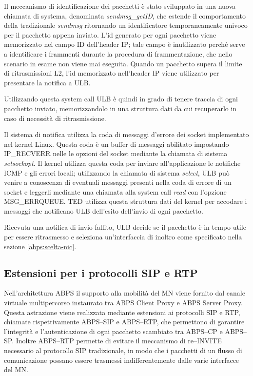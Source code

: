 \documentclass[12pt,a4paper,openright,twoside]{book}
\begin{document}
Il meccanismo di identificazione dei pacchetti è stato sviluppato in
una nuova chiamata di systema, denominata \emph{sendmsg\_getID}, che
estende il comportamento della tradizionale \emph{sendmsg} ritornando
un identificatore temporaneamente univoco per il pacchetto appena
inviato. L'id generato per ogni pacchetto viene memorizzato nel campo
ID dell'header IP; tale campo è inutilizzato perché serve a
identificare i frammenti durante la procedura di frammentazione, che
nello scenario in esame non viene mai eseguita. Quando un pacchetto
supera il limite di ritrasmissioni L2, l'id memorizzato nell'header IP
viene utilizzato per presentare la notifica a ULB.

Utilizzando questa system call ULB è quindi in grado di
tenere traccia di ogni pacchetto inviato, memorizzandolo in una
struttura dati da cui recuperarlo in caso di necessità di
ritrasmissione.

Il sistema di notifica utilizza la coda di messaggi d'errore dei
socket implementato nel kernel Linux. Questa coda è un buffer di
messaggi abilitato impostando IP\_RECVERR nelle le opzioni del socket
mediante la chiamata di sistema \emph{setsockopt}. Il kernel utilizza
questa coda per inviare all'applicazione le notifiche ICMP e gli
errori locali; utilizzando la chiamata di sistema \emph{select}, ULB
può venire a conoscenza di eventuali messaggi presenti nella coda di
errore di un socket e leggerli mediante una chiamata alla system call
\emph{read} con l'opzione MSG\_ERRQUEUE. TED utilizza questa struttura
dati del kernel per accodare i messaggi che notificano ULB dell'esito
dell'invio di ogni pacchetto.

Ricevuta una notifica di invio fallito, ULB decide se il pacchetto è
in tempo utile per essere ritrasmesso e seleziona un'interfaccia di
inoltro come specificato nella sezione \ref{abps:scelta-nic}.

\subsection{Estensioni per i protocolli SIP e RTP}

Nell'architettura ABPS il supporto alla mobilità del MN viene fornito
dal canale virtuale multipercorso instaurato tra ABPS Client Proxy e
ABPS Server Proxy. Questa astrazione viene realizzata mediante
estensioni ai protocolli SIP e RTP, chiamate rispettivamente ABPS--SIP
e ABPS--RTP, che permettono di garantire l'integrità e
l'autenticazione di ogni pacchetto scambiato tra ABPS--CP e
ABPS--SP. Inoltre ABPS--RTP permette di evitare il meccanismo di
re--INVITE necessario al protocollo SIP tradizionale, in modo che i
pacchetti di un flusso di comunicazione possano essere trasmessi
indifferentemente dalle varie interfacce del MN.
\end{document}
